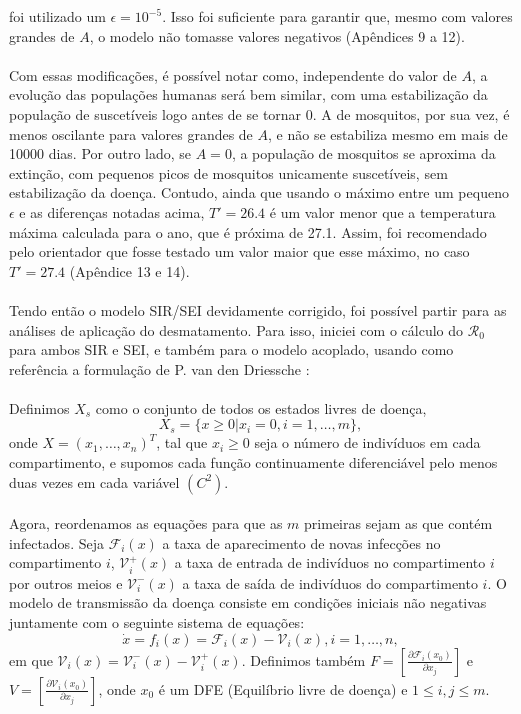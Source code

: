 foi utilizado um $\epsilon = 10^{-5}$. Isso foi suficiente para garantir que, 
mesmo com valores grandes de $A$, o modelo não tomasse valores 
negativos (Apêndices 9 a 12). 
\\\\
Com essas modificações, é possível notar como, independente do valor de $A$, a evolução das populações humanas será bem similar, com uma estabilização da população de suscetíveis logo antes de se tornar 0. A de mosquitos, por sua vez, é menos oscilante para valores grandes de $A$, e não se estabiliza mesmo em mais de 10000 dias. Por outro lado, se $A=0$, a população de mosquitos se aproxima da extinção, com pequenos picos de mosquitos unicamente suscetíveis, sem estabilização da doença. Contudo, ainda que usando o máximo entre um pequeno $\epsilon$ e as diferenças notadas acima, $T'=26.4$ é um valor menor que a temperatura máxima calculada para o ano, que é próxima de 27.1. Assim, foi recomendado pelo orientador que fosse testado um valor maior que esse máximo, no caso $T'=27.4$ (Apêndice 13 e 14).
\\\\
Tendo então o modelo SIR/SEI devidamente corrigido, foi possível partir para as análises de aplicação do desmatamento. Para isso, iniciei com o cálculo do $\mathcal{R}_0$ para ambos SIR e SEI, e também para o modelo acoplado, usando como referência a formulação de P. van den Driessche \cite{VANDENDRIESSCHE200229}:
\\\\
Definimos $X_s$ como o conjunto de todos os estados livres de doença, 
$$X_s=\{x \geq 0|x_i=0, i=1,\ldots,m\},$$
onde $X=(x_1,\ldots, x_n)^T$, tal que $x_i\geq 0$ seja o número de indivíduos em cada compartimento, e supomos cada função continuamente diferenciável pelo menos duas vezes em cada variável $(C^2)$.
\\\\
Agora, reordenamos as equações para que as $m$ primeiras sejam as que contém infectados. Seja ${\mathcal F}_i(x)$ a taxa de aparecimento de novas infecções no compartimento $i$, ${\mathcal V}_i^+(x)$ a taxa de entrada de indivíduos no compartimento $i$ por outros meios e ${\mathcal V}_i^-(x)$ a taxa de saída de indivíduos do compartimento $i$. O modelo de transmissão da doença consiste em condições iniciais não negativas juntamente com o seguinte sistema de equações:
$$\dot{x}=f_i(x)={\mathcal F}_i(x)-{\mathcal V}_i(x), i=1,\ldots, n,$$
em que ${\mathcal V}_i (x) = {\mathcal V}_i^{-}(x) - {\mathcal V}_i^+(x)$. Definimos também $F=\left[\frac{\partial {\mathcal F}_i (x_0)}{\partial x_j}\right]$ e $V=\left[\frac{\partial {\mathcal V}_i (x_0) }{\partial x_j}\right]$, onde $x_0$ é um DFE (Equilíbrio livre de doença) e $1\leq i,j \leq m$. 
